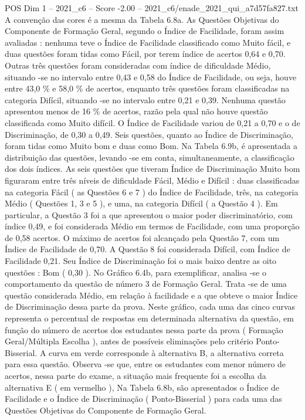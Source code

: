 \begin{textsample}{POS Dim 1 – 2021\_c6 – Score -2.00 – 2021\_c6/enade\_2021\_qui\_a7d57fa827.txt}
A convenção das cores é a mesma da Tabela 6.8a.
As Questões Objetivas do Componente de Formação Geral, segundo o Índice de Facilidade, foram assim avaliadas : nenhuma teve o Índice de Facilidade classificado como Muito fácil, e duas questões foram tidas como Fácil, por terem índice de acertos 0,64 e 0,70.
Outras três questões foram consideradas com índice de dificuldade Médio, situando -se no intervalo entre 0,43 e 0,58 do Índice de Facilidade, ou seja, houve entre 43,0 \% e 58,0 \% de acertos, enquanto três questões foram classificadas na categoria Difícil, situando -se no intervalo entre 0,21 e 0,39.
Nenhuma questão apresentou menos de 16 \% de acertos, razão pela qual não houve questão classificada como Muito difícil.
O Índice de Facilidade variou de 0,21 a 0,70 e o de Discriminação, de 0,30 a 0,49.
Seis questões, quanto ao Índice de Discriminação, foram tidas como Muito bom e duas como Bom.
Na Tabela 6.9b, é apresentada a distribuição das questões, levando -se em conta, simultaneamente, a classificação dos dois índices.
As seis questões que tiveram Índice de Discriminação Muito bom figuraram entre três níveis de dificuldade Fácil, Médio e Difícil : duas classificadas na categoria Fácil ( as Questões 6 e 7 ) do Índice de Facilidade, três, na categoria Médio ( Questões 1, 3 e 5 ), e uma, na categoria Difícil ( a Questão 4 ).
Em particular, a Questão 3 foi a que apresentou o maior poder discriminatório, com índice 0,49, e foi considerada Médio em termos de Facilidade, com uma proporção de 0,58 acertos.
O máximo de acertos foi alcançado pela Questão 7, com um Índice de Facilidade de 0,70.
A Questão 8 foi considerada Difícil, com Índice de Facilidade 0,21.
Seu Índice de Discriminação foi o mais baixo dentre as oito questões : Bom ( 0,30 ).
No Gráfico 6.4b, para exemplificar, analisa -se o comportamento da questão de número 3 de Formação Geral.
Trata -se de uma questão considerada Médio, em relação à facilidade e a que obteve o maior Índice de Discriminação dessa parte da prova.
Neste gráfico, cada uma das cinco curvas representa o percentual de respostas em determinada alternativa da questão, em função do número de acertos dos estudantes nessa parte da prova ( Formação Geral/Múltipla Escolha ), antes de possíveis eliminações pelo critério Ponto-Bisserial.
A curva em verde corresponde à alternativa B, a alternativa correta para essa questão.
Observa -se que, entre os estudantes com menor número de acertos, nessa parte do exame, a situação mais frequente foi a escolha da alternativa E ( em vermelho ), Na Tabela 6.8b, são apresentados o Índice de Facilidade e o Índice de Discriminação ( Ponto-Bisserial ) para cada uma das Questões Objetivas do Componente de Formação Geral.

\end{textsample}
